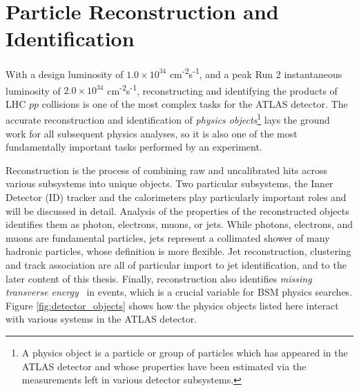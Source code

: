 \chapter{Particle Reconstruction and Identification}
\label{ch:part_reco}

With a design luminosity of $1.0 \times 10^{34}$ cm\textsuperscript{-2}s\textsuperscript{-1}, and a peak Run 2 instantaneous luminosity of $2.0 \times 10^{34}$ cm\textsuperscript{-2}s\textsuperscript{-1}, reconstructing and identifying the products of LHC $pp$ collisions is one of the most complex tasks for the ATLAS detector. The accurate reconstruction and identification of \textit{physics objects}\footnote{A physics object is a particle or group of particles which has appeared in the ATLAS detector and whose properties have been estimated via the measurements left in various detector subsystems.} lays the ground work for all subsequent physics analyses, so it is also one of the most fundamentally important tasks performed by an experiment. \par

Reconstruction is the process of combining raw and uncalibrated hits across various subsystems into unique objects. Two particular subsystems, the Inner Detector (ID) tracker and the calorimeters play particularly important roles and will be discussed in detail. Analysis of the properties of the reconstructed objects identifies them as photon, electrons, muons, or jets. While photons, electrons, and muons are fundamental particles, jets represent a collimated shower of many hadronic particles, whose definition is more flexible. Jet reconstruction, clustering and track association are all of particular import to jet identification, and to the later content of this thesis. Finally, reconstruction also identifies \textit{missing transverse energy} \met~in events, which is a crucial variable for BSM physics searches. Figure \ref{fig:detector_objects} shows how the physics objects listed here interact with various systems in the ATLAS detector. 

